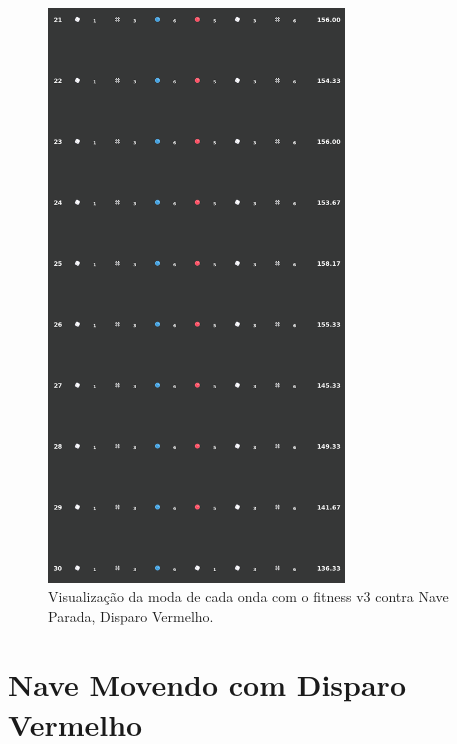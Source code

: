 \begin{figure}[H]
  \centering
  \includegraphics[width=0.7\textwidth]{figuras/ss/ss_redstill_ai_mode_2_3.png}
  \caption{Visualização da moda de cada onda com o fitness v3 contra Nave Parada, Disparo Vermelho.}
  \label{fig:ss-moda-rs-2-3}
\end{figure}

\section{Nave Movendo com Disparo Vermelho}
\label{sec:apend-moda-ss-rm-v3}

